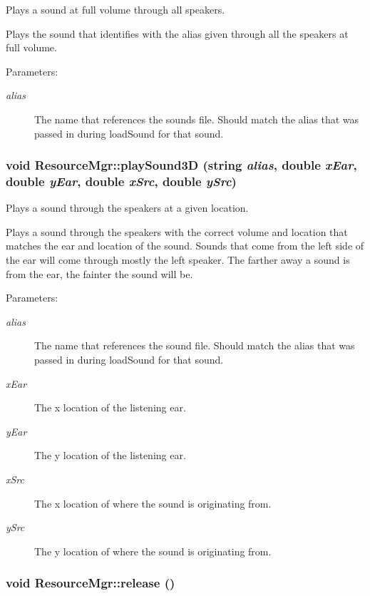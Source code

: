 Plays a sound at full volume through all speakers. 

Plays the sound that identifies with the alias given through all the speakers at full volume. \begin{Desc}
\item[Parameters:]
\begin{description}
\item[{\em alias}]The name that references the sounds file. Should match the alias that was passed in during loadSound for that sound. \end{description}
\end{Desc}
\hypertarget{class_resource_mgr_9b916235594f034f55da0570182ca429}{
\subsubsection[{playSound3D}]{\setlength{\rightskip}{0pt plus 5cm}void ResourceMgr::playSound3D (string {\em alias}, \/  double {\em xEar}, \/  double {\em yEar}, \/  double {\em xSrc}, \/  double {\em ySrc})}}
\label{class_resource_mgr_9b916235594f034f55da0570182ca429}


Plays a sound through the speakers at a given location. 

Plays a sound through the speakers with the correct volume and location that matches the ear and location of the sound. Sounds that come from the left side of the ear will come through mostly the left speaker. The farther away a sound is from the ear, the fainter the sound will be. \begin{Desc}
\item[Parameters:]
\begin{description}
\item[{\em alias}]The name that references the sound file. Should match the alias that was passed in during loadSound for that sound. \item[{\em xEar}]The x location of the listening ear. \item[{\em yEar}]The y location of the listening ear. \item[{\em xSrc}]The x location of where the sound is originating from. \item[{\em ySrc}]The y location of where the sound is originating from. \end{description}
\end{Desc}
\hypertarget{class_resource_mgr_df71591bd5706857b2964efc9ab9aad0}{
\subsubsection[{release}]{\setlength{\rightskip}{0pt plus 5cm}void ResourceMgr::release ()}}
\label{class_resource_mgr_df71591bd5706857b2964efc9ab9aad0}


